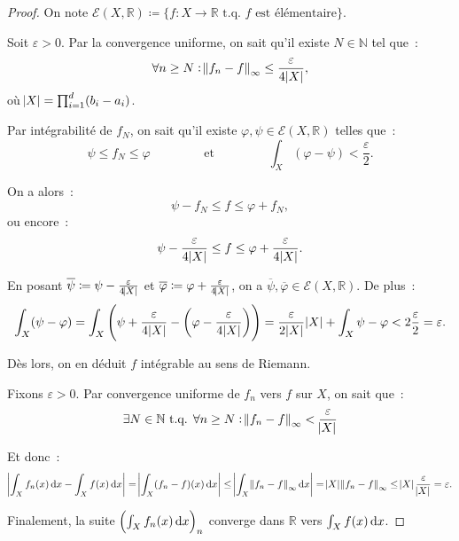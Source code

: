 \documentclass{report}
\theoremstyle{definition}
\theoremstyle{remark}
\newcommand{\R}{\mathbb R}
\newcommand{\N}{\mathbb N}
\newcommand{\tq}{\text{ t.q. }}
\begin{document}
			\begin{proof} On note $\mathcal E(X, \R) \coloneqq \{f : X \to \R \tq f \text{ est élémentaire}\}$.

			Soit $\varepsilon > 0$. Par la convergence uniforme, on sait qu'il existe $N \in \N$ tel que~:
			\[\forall n \geq N : \norm {f_n - f}_\infty \leq \frac \varepsilon{4\abs X},\]
			où $\abs X = \prod_{i=1}^d(b_i - a_i)$.

			Par intégrabilité de $f_N$, on sait qu'il existe $\varphi, \psi \in \mathcal E(X, \R)$ telles que~:
			\[\psi \leq f_N \leq \varphi \qquad\qquad \text{ et } \qquad\qquad \int_X(\varphi - \psi) < \frac \varepsilon2.\]

			On a alors~:
			\[\psi - f_N \leq f \leq \varphi + f_N,\]
			ou encore~:
			\[\psi - \frac \varepsilon{4\abs X} \leq f \leq \varphi + \frac \varepsilon{4\abs X}.\]

			En posant $\overline \psi \coloneqq \psi - \frac \varepsilon{4\abs X}$ et $\overline \varphi \coloneqq \varphi + \frac \varepsilon{4\abs X}$, on a
			$\overline \psi, \overline \varphi \in \mathcal E(X, \R)$. De plus~:
			\[\int_X(\psi-\varphi) = \int_X\left(\psi + \frac \varepsilon{4\abs X} - \left(\varphi - \frac \varepsilon{4\abs X}\right)\right)
				= \frac \varepsilon{2\abs X}\abs X + \int_X \psi - \varphi < 2\frac \varepsilon2 = \varepsilon.\]

			Dès lors, on en déduit $f$ intégrable au sens de Riemann.

			Fixons $\varepsilon > 0$. Par convergence uniforme de $f_n$ vers $f$ sur $X$, on sait que~:
			\[\exists N \in \N \tq \forall n \geq N : \norm {f_n - f}_\infty < \frac \varepsilon{\abs X}\]

			Et donc~:
			\[\abs {\int_X f_n(x)\dif x - \int_X f(x)\dif x} = \abs {\int_X (f_n-f)(x)\dif x} \leq \abs {\int_X\norm {f_n-f}_\infty\dif x}
				= \abs X\norm{f_n-f}_\infty \leq \abs X\frac \varepsilon{\abs X} = \varepsilon.\]

			Finalement, la suite $\left(\int_X f_n(x)\dif x\right)_n$ converge dans $\R$ vers $\int_X f(x)\dif x$.
			\end{proof}
\end{document}

